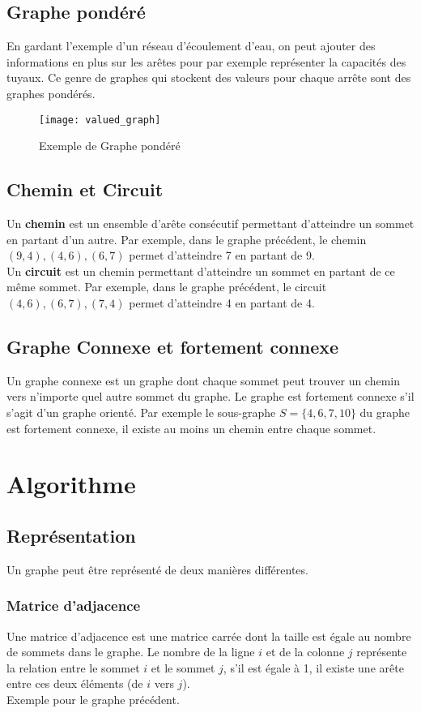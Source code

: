 \documentclass[11pt]{extarticle}
\begin{document}
\subsection{Graphe pondéré}
En gardant l'exemple d'un réseau d'écoulement d'eau, on peut ajouter des informations en plus sur les arêtes pour par exemple représenter la capacités des tuyaux. Ce genre de graphes qui stockent des valeurs pour chaque arrête sont des graphes pondérés.
\begin{figure}[h]
\begin{center}
\texttt{[image: valued\_graph]}
\caption{Exemple de Graphe pondéré}
\end{center}
\end{figure}
\newpage
\subsection{Chemin et Circuit}
Un \textbf{chemin} est un ensemble d'arête consécutif permettant d'atteindre un sommet en partant d'un autre. Par exemple, dans le graphe précédent, le chemin $(9, 4), (4, 6), (6, 7)$ permet d'atteindre 7 en partant de 9.\\
Un \textbf{circuit} est un chemin permettant d'atteindre un sommet en partant de ce même sommet. Par exemple, dans le graphe précédent, le circuit $(4, 6), (6, 7), (7, 4)$ permet d'atteindre 4 en partant de 4.\\
\subsection{Graphe Connexe et fortement connexe}
Un graphe connexe est un graphe dont chaque sommet peut trouver un chemin vers n'importe quel autre sommet du graphe. Le graphe est fortement connexe s'il s'agit d'un graphe orienté. Par exemple le sous-graphe $S=\{4, 6, 7, 10\}$ du graphe est fortement connexe, il existe au moins un chemin entre chaque sommet.
\newpage
\section{Algorithme}
\subsection{Représentation}
Un graphe peut être représenté de deux manières différentes.
\subsubsection{Matrice d'adjacence}
Une matrice d'adjacence est une matrice carrée dont la taille est égale au nombre de sommets dans le graphe. Le nombre de la ligne $i$ et de la colonne $j$ représente la relation entre le sommet $i$ et le sommet $j$, s'il est égale à 1, il existe une arête entre ces deux éléments (de $i$ vers $j$). \\
Exemple pour le graphe précédent. \\
\end{document}
